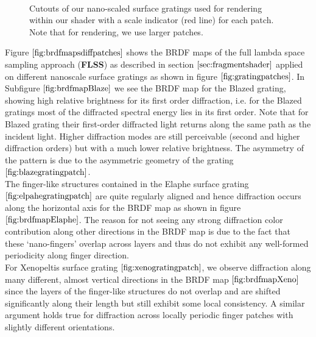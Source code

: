 \begin{figure}[H]
  \centering
~
~

\caption[Our Gratings]{Cutouts of our nano-scaled surface gratings used for rendering within our shader with a scale indicator (red line) for each patch. Note that for rendering, we use larger patches.}
\label{fig:gratingpatches}
\end{figure}

Figure $\ref{fig:brdfmapsdiffpatches}$ shows the BRDF maps of the full lambda space sampling approach (\textbf{FLSS}) as described in section $\ref{sec:fragmentshader}$ applied on different nanoscale surface gratings as shown in figure $\ref{fig:gratingpatches}$. In Subfigure $\ref{fig:brdfmapBlaze}$ we see the BRDF map for the Blazed grating, showing high relative brightness for its first order diffraction, i.e. for the Blazed gratings most of the diffracted spectral energy lies in its first order. Note that for Blazed grating their first-order diffracted light returns along the same path as the incident light. Higher diffraction modes are still perceivable (second and higher diffraction orders) but with a much lower relative brightness. The asymmetry of the pattern is due to the asymmetric geometry of the grating $\ref{fig:blazegratingpatch}$. \\

The finger-like structures contained in the Elaphe surface grating $\ref{fig:elpahegratingpatch}$ are quite regularly aligned and hence diffraction occurs along the horizontal axis for the BRDF map as shown in figure $\ref{fig:brdfmapElaphe}$. The reason for not seeing any strong diffraction color contribution along other directions in the BRDF map is due to the fact that these ‘nano-fingers’ overlap across layers and thus do not exhibit any well-formed periodicity along finger direction. \\

For Xenopeltis surface grating $\ref{fig:xenogratingpatch}$, we observe diffraction along many different, almost vertical directions in the BRDF map $\ref{fig:brdfmapXeno}$ since the layers of the finger-like structures do not overlap and are shifted significantly along their length but still exhibit some local consistency. A similar argument holds true for diffraction across locally periodic finger patches with slightly different orientations. 

